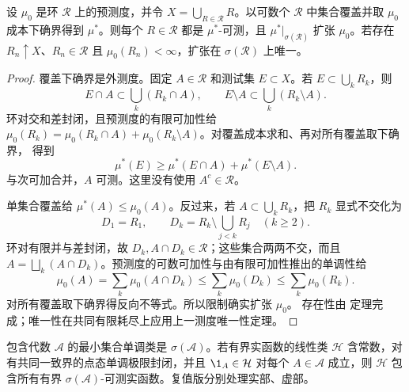 \begin{theorem}[\Caratheodory{} 扩张：环版]\label{theorem:2-2-1-0}
设 $\mu_0$ 是环 $\mathcal R$ 上的预测度，并令
$X=\bigcup_{R\in\mathcal R}R$。以可数个 $\mathcal R$ 中集合覆盖并取 $\mu_0$ 成本下确界得到
$\mu^*$。则每个 $R\in\mathcal R$ 都是 $\mu^*$-可测，且
$\mu^*|_{\sigma(\mathcal R)}$ 扩张 $\mu_0$。若存在
$R_n\uparrow X$、$R_n\in\mathcal R$ 且 $\mu_0(R_n)<\infty$，扩张在
$\sigma(\mathcal R)$ 上唯一。
\end{theorem}

\begin{proof}
覆盖下确界是外测度。固定 $A\in\mathcal R$ 和测试集 $E\subset X$。若
$E\subset\bigcup_kR_k$，则
\[
 E\cap A\subset\bigcup_k(R_k\cap A),\qquad
 E\setminus A\subset\bigcup_k(R_k\setminus A).
\]
环对交和差封闭，且预测度的有限可加性给
$\mu_0(R_k)=\mu_0(R_k\cap A)+\mu_0(R_k\setminus A)$。对覆盖成本求和、再对所有覆盖取下确界，
得到
\[
 \mu^*(E)\ge\mu^*(E\cap A)+\mu^*(E\setminus A).
\]
与次可加合并，$A$ 可测。这里没有使用 $A^c\in\mathcal R$。

单集合覆盖给 $\mu^*(A)\le\mu_0(A)$。反过来，若 $A\subset\bigcup_kR_k$，把
$R_k$ 显式不交化为
\[
 D_1=R_1,\qquad D_k=R_k\setminus\bigcup_{j<k}R_j\quad(k\ge2).
\]
环对有限并与差封闭，故 $D_k,A\cap D_k\in\mathcal R$；这些集合两两不交，而且
$A=\bigsqcup_k(A\cap D_k)$。预测度的可数可加性与由有限可加性推出的单调性给
\[
 \mu_0(A)=\sum_k\mu_0(A\cap D_k)
 \le\sum_k\mu_0(D_k)
 \le\sum_k\mu_0(R_k).
\]
对所有覆盖取下确界得反向不等式。所以限制确实扩张 $\mu_0$。
存在性由 \Caratheodory{} 定理完成；唯一性在共同有限耗尽上应用上一测度唯一性定理。
\end{proof}

\begin{theorem}[集合与函数单调类定理]\label{theorem:2-2-1-3}
包含代数 $\mathcal A$ 的最小集合单调类是 $\sigma(\mathcal A)$。若有界实函数的线性类
$\mathcal H$ 含常数，对有共同一致界的点态单调极限封闭，并且
$\1_A\in\mathcal H$ 对每个 $A\in\mathcal A$ 成立，则 $\mathcal H$ 包含所有有界
$\sigma(\mathcal A)$-可测实函数。复值版分别处理实部、虚部。
\end{theorem}

